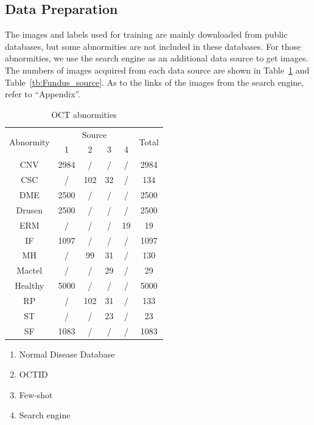 \documentclass{article}
\begin{document}
	\subsection{Data Preparation}
	
	The images and labels used for training are mainly downloaded from public databases, but some abnormities are not included in these databases. For those abnormities, we use the search engine as an additional data source to get images. The numbers of images acquired from each data source are shown in Table~\ref{tb:OCT_source} and Table~\ref{tb:Fundus_source}. As to the links of the images from the search engine, refer to ``Appendix''. 
	
	\begin{minipage}[t]{0.4\linewidth}
		{
			\fontsize{9}{12}\selectfont
			{
				\begin{longtable}{cccccc}
					\caption{OCT abnormities}
					\label{tb:OCT_source}\\
					\toprule
					\multirow{2}{*}{Abnormity}&\multicolumn{4}{c}{Source}&\multirow{2}{*}{Total}\\
					&1&2&3&4&\\
					\midrule
					CNV    &2984&/  &/ &/ &2984\\
					CSC    &/   &102&32&/ &134 \\
					DME    &2500&/  &/ &/ &2500\\
					Drusen &2500&/  &/ &/ &2500\\
					ERM    &/   &/  &/ &19&19  \\
					IF     &1097&/  &/ &/ &1097\\
					MH     &/   &99 &31&/ &130 \\
					Mactel &/   &/  &29&/ &29  \\
					Healthy&5000&/  &/ &/ &5000\\
					RP     &/   &102&31&/ &133 \\
					ST     &/   &/  &23&/ &23  \\
					SF     &1083&/  &/ &/ &1083\\
					\bottomrule
				\end{longtable}
				
				\vspace{0.5cm}
				\begin{enumerate}
					\item Normal Disease Database \autocite{Kermany_database}
					\vspace{-0.2cm}
					
					\item OCTID \autocite{Gholami_Roy_Parthasarathy_Lakshminarayanan_2020}
					\vspace{-0.2cm}
					
					\item Few-shot \autocite{Yoo_2020}
					\vspace{-0.2cm}
					
					\item Search engine
					\vspace{-0.2cm}
				\end{enumerate}
				
				\vspace{0.5cm}
			}
		}
	\end{minipage}
\end{document}
